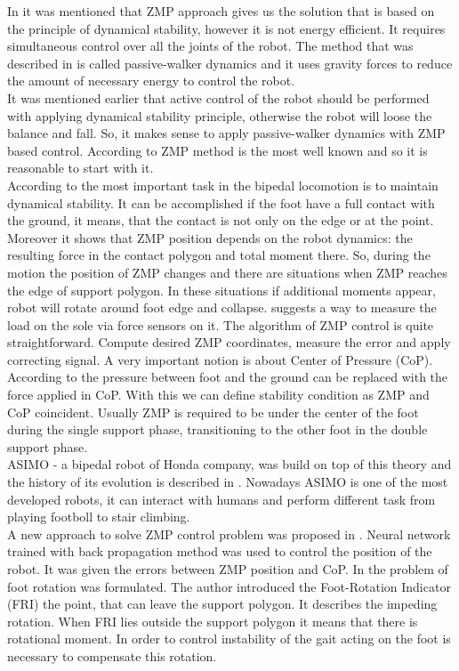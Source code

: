 \documentclass[12pt,a4paper]{report}
\begin{document}
		In \cite{manchester2011stable} it was mentioned that ZMP approach gives us the solution that is based on the principle of dynamical stability, however it is not energy efficient. It requires simultaneous control over all the joints of the robot. The method that was described in \cite{collins2001three} is called passive-walker dynamics and it uses gravity forces to reduce the amount of necessary energy to control the robot.\\
		It was mentioned earlier that active control of the robot should be performed with applying dynamical stability principle, otherwise the robot will loose the balance and fall. So, it makes sense to apply passive-walker dynamics with ZMP based control. According to \cite{vukobratovic2004zero} ZMP method is the most well known and so it is reasonable to start with it. \\
		According to \cite{vukobratovic2004zero} the most important task in the bipedal locomotion is to maintain dynamical stability. It can be accomplished if the foot have a full contact with the ground, it means, that the contact is not only on the edge or at the point. Moreover it shows that ZMP position depends on the robot dynamics: the resulting force in the contact polygon and total moment there. So, during the motion the position of ZMP changes and there are situations when ZMP reaches the edge of support polygon. In these situations if additional moments appear, robot will rotate around foot edge and collapse. \cite{vukobratovic2004zero} suggests a way to measure the load on the sole via force sensors on it. The algorithm of ZMP control is quite straightforward. Compute desired ZMP coordinates, measure the error and apply correcting signal. A very important notion is about Center of Pressure (CoP). According to \cite{vukobratovic2004zero} the pressure between foot and the ground can be replaced with the force applied in CoP. With this we can define stability condition as ZMP and CoP coincident. Usually ZMP is required to be under the center of the foot during the single support phase, transitioning to the other foot in the double support phase.\\
		ASIMO - a bipedal robot of Honda company, was build on top of this theory and the history of its evolution is described in \cite{hirai1998development}. Nowadays ASIMO is one of the most developed robots, it can interact with humans and perform different task  from playing footboll to stair climbing.\\ 
		A new approach to solve ZMP control problem was proposed in \cite{kim2012zmp}. Neural network trained with back propagation method was used to control the position of the robot. It was given the errors between ZMP position and CoP.
		In \cite{goswami1999postural} the problem of foot rotation was formulated. The author introduced the Foot-Rotation Indicator (FRI) the point, that can leave the support polygon. It describes the impeding rotation. When FRI lies outside the support polygon it means that there is rotational moment. In order to control instability of the gait acting on the foot is necessary to compensate this rotation.
\end{document}
